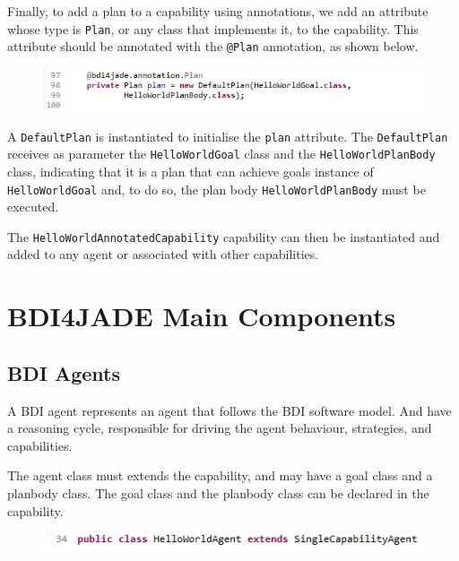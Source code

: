 \documentclass{article}
\begin{document}
Finally, to add a plan to a capability using annotations, we add an attribute whose type is \texttt{Plan}, or any class that implements it, to the capability. This attribute should be annotated with the \texttt{@Plan} annotation, as shown below.

\begin{figure}[!h]
\centering
\includegraphics[width=\linewidth]{objplan}
\label{fig:objplan}
\end{figure}

A \texttt{DefaultPlan} is instantiated to initialise the \texttt{plan} attribute. The \texttt{DefaultPlan}  receives as parameter the \texttt{HelloWorldGoal} class and the \texttt{HelloWorldPlanBody} class, indicating that it is a plan that can achieve goals instance of \texttt{HelloWorldGoal} and, to do so, the plan body \texttt{HelloWorldPlanBody} must be executed.

The \texttt{HelloWorldAnnotatedCapability} capability can then be instantiated and added to any agent or associated with other capabilities.

\section{BDI4JADE Main Components}\label{sec:components}

\subsection{BDI Agents} \label{sec:BDIagent}

A BDI agent represents an agent that follows the BDI  software model. And have a reasoning cycle, responsible for driving the agent behaviour, strategies, and capabilities.

The agent class must extends the capability, and may have a goal class and a planbody class. The goal class and the planbody class can be declared in the capability.

\begin{figure}[!h]
	\centering
	\includegraphics[width=\linewidth]{agentdecl}
	\label{fig:agentdecl}
\end{figure}
\end{document}
